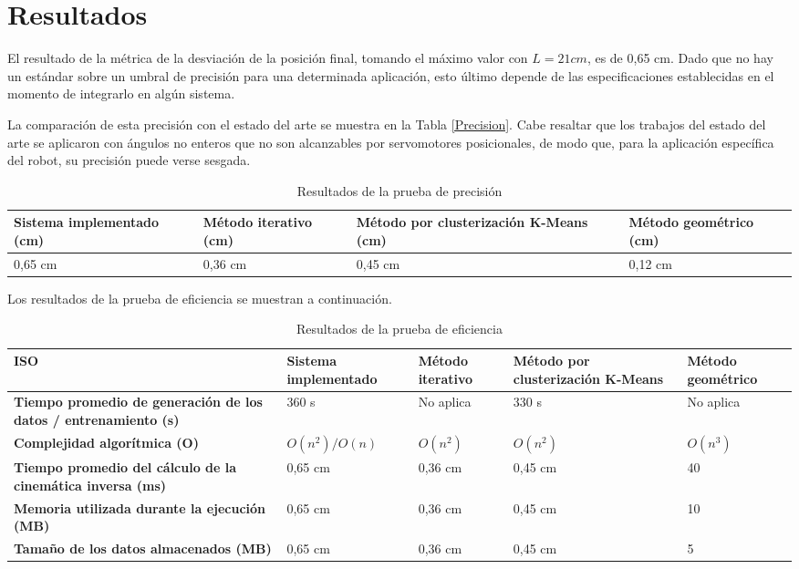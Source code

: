 \section{Resultados}

El resultado de la métrica de la desviación de la posición final, tomando el máximo valor con $L = 21 cm$, es de 0,65 cm. Dado que no hay un estándar sobre un umbral de precisión para una determinada aplicación, esto último depende de las especificaciones establecidas en el momento de integrarlo en algún sistema.

La comparación de esta precisión con el estado del arte se muestra en la Tabla \ref{Precision}. Cabe resaltar que los trabajos del estado del arte se aplicaron con ángulos no enteros que no son alcanzables por servomotores posicionales, de modo que, para la aplicación específica del robot, su precisión puede verse sesgada.

\begin{table}[ht]
	\centering
	\begin{tabular}{p{5cm}p{4cm}p{3.6cm}p{4cm}}
		\hline
		\textbf{Sistema implementado (cm)} & \textbf{Método iterativo (cm)} & \textbf{Método por clusterización K-Means (cm)} & \textbf{Método geométrico (cm)} \\
		\hline
		0,65 cm & 0,36 cm & 0,45 cm & 0,12 cm \\
		\hline
	\end{tabular}
	\caption{Resultados de la prueba de precisión}
	\label{tab:Precision}
\end{table}

Los resultados de la prueba de eficiencia se muestran a continuación.

\begin{table}[ht]
	\centering
	\begin{tabular}{p{3.2cm}p{3.2cm}p{3.2cm}p{3.2cm}p{3.2cm}}
		\hline
	    \textbf{ISO} & \textbf{Sistema implementado} & \textbf{Método iterativo} & \textbf{Método por clusterización K-Means} & \textbf{Método geométrico} \\
		\hline
		\textbf{Tiempo promedio de generación de los datos / entrenamiento (s)} & 360 s & No aplica & 330 s & No aplica \\
		\textbf{Complejidad algorítmica (O)} & $O(n^2)/O(n)$ & $O(n^2)$ & $O(n^2)$ & $O(n^3)$ \\
		\textbf{Tiempo promedio del cálculo de la cinemática inversa (ms)} & 0,65 cm & 0,36 cm & 0,45 cm & 40 \\
		\textbf{Memoria utilizada durante la ejecución (MB)} & 0,65 cm & 0,36 cm & 0,45 cm & 10 \\
		\textbf{Tamaño de los datos almacenados (MB)} & 0,65 cm & 0,36 cm & 0,45 cm & 5 \\
		\hline
	\end{tabular}
	\caption{Resultados de la prueba de eficiencia}
	\label{tab:Precision}
\end{table}
